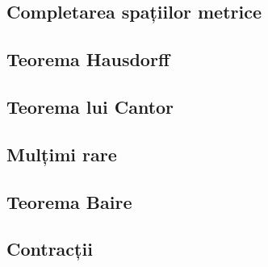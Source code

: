 \documentclass[a4paper,12pt]{article}
\theoremstyle{change}
\begin{document}
\subsection{Completarea spațiilor metrice}

\subsection{Teorema Hausdorff}


\subsection{Teorema lui Cantor}

\subsection{Mulțimi rare}

\subsection{Teorema Baire}


\subsection{Contracții}

\end{document}

